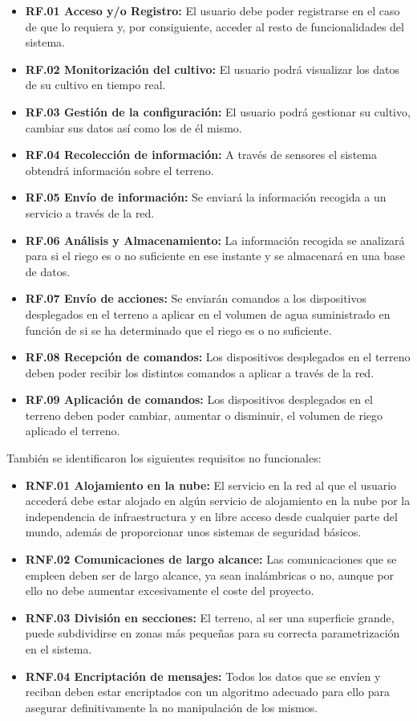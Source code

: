 \begin{itemize}
    \item \textbf{RF.01 Acceso y/o Registro:}
    El usuario debe poder registrarse en el caso de que lo requiera y, por consiguiente, acceder al resto de funcionalidades del sistema.
    \item \textbf{RF.02 Monitorización del cultivo:}
    El usuario podrá visualizar los datos de su cultivo en tiempo real.
    \item \textbf{RF.03 Gestión de la configuración:}
    El usuario podrá gestionar su cultivo, cambiar sus datos así como los de él mismo.
    \item \textbf{RF.04 Recolección de información:}
    A través de sensores el sistema obtendrá información sobre el terreno.
    \item \textbf{RF.05 Envío de información:}
    Se enviará la información recogida a un servicio a través de la red.
    \item \textbf{RF.06 Análisis y Almacenamiento:}
    La información recogida se analizará para si el riego es o no suficiente en ese instante y se almacenará en una base de datos.
    \item \textbf{RF.07 Envío de acciones:}
    Se enviarán comandos a los dispositivos desplegados en el terreno a aplicar en el volumen de agua suministrado en función de si se ha determinado que el riego es o no suficiente.
    \item \textbf{RF.08 Recepción de comandos:}
    Los dispositivos desplegados en el terreno deben poder recibir los distintos comandos a aplicar a través de la red.
    \item \textbf{RF.09 Aplicación de comandos:}
    Los dispositivos desplegados en el terreno deben poder cambiar, aumentar o disminuir, el volumen de riego aplicado el terreno.
\end{itemize}

También se identificaron los siguientes requisitos no funcionales:

\begin{itemize}
    \item \textbf{RNF.01 Alojamiento en la nube:}
    El servicio en la red al que el usuario accederá debe estar alojado en algún servicio de alojamiento en la nube por la independencia de infraestructura y en libre acceso desde cualquier parte del mundo, además de proporcionar unos sistemas de seguridad básicos.
    \item \textbf{RNF.02 Comunicaciones de largo alcance:}
    Las comunicaciones que se empleen deben ser de largo alcance, ya sean inalámbricas o no, aunque por ello no debe aumentar excesivamente el coste del proyecto.
    \item \textbf{RNF.03 División en secciones:}
    El terreno, al ser una superficie grande, puede subdividirse en zonas más pequeñas para su correcta parametrización en el sistema.
    \item \textbf{RNF.04 Encriptación de mensajes:}
    Todos los datos que se envíen y reciban deben estar encriptados con un algoritmo adecuado para ello para asegurar definitivamente la no manipulación de los mismos.
\end{itemize}

